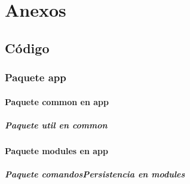 \chapter*{Anexos}
\section{Código}

%
\subsection{Paquete app}
\subsubsection{Paquete common en app}

\paragraph{Paquete util en common}




\subsubsection{Paquete modules en app}

\paragraph{Paquete comandosPersistencia en modules}











